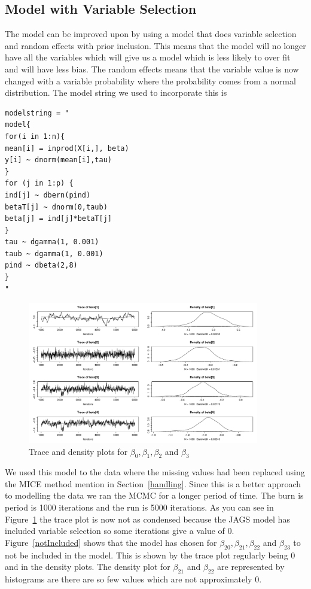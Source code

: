 \documentclass{article}
\begin{document}
\subsection{Model with Variable Selection}
The model can be improved upon by using a model that does variable selection and random effects with prior inclusion. This means that the model will no longer have all the variables which will give us a model which is less likely to over fit and will have less bias. The random effects means that the variable value is now changed with a variable probability where the probability comes from a normal distribution. The model string we used to incorporate this is
\begin{verbatim}
modelstring = "
model{
for(i in 1:n){
mean[i] = inprod(X[i,], beta)
y[i] ~ dnorm(mean[i],tau)
}
for (j in 1:p) {
ind[j] ~ dbern(pind)
betaT[j] ~ dnorm(0,taub)
beta[j] = ind[j]*betaT[j]
}
tau ~ dgamma(1, 0.001)
taub ~ dgamma(1, 0.001)
pind ~ dbeta(2,8)
}
"
\end{verbatim}
\begin{figure}[h!]
\centering
\includegraphics[width = 0.9\textwidth]{micePlot.pdf}
\caption{Trace and density plots for $\beta_0, \beta_1, \beta_2$ and $\beta_3$}
\label{micePlot}
\end{figure}
We used this model to the data where the missing values had been replaced using the MICE method mention in Section~\ref{handling}. Since this is a better approach to modelling the data we ran the MCMC for a longer period of time. The burn is period is 1000 iterations and the run is 5000 iterations. As you can see in Figure~\ref{micePlot} the trace plot is now not as condensed because the JAGS model has included variable selection so some iterations give a value of 0. Figure~\ref{notIncluded} shows that the model has chosen for $\beta_20, \beta_21, \beta_22$ and $\beta_23$ to not be included in the model. This is shown by the trace plot regularly being 0 and in the density plots. The density plot for $\beta_21$ and $\beta_22$ are represented by histograms are there are so few values which are not approximately 0.
\end{document}
